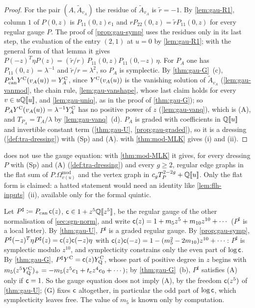 \begin{proof}
For the pair $(A,\tilde A_{v_A})$ the residue of $\tilde A_{v_A}$ is $\tilde r=-1$. By \cref{lem:gau-R1}, column $1$ of $P(0,z)$ is $P_{11}(0,z)e_1$ and $rP_{22}(0,z)=\tilde rP_{11}(0,z)$ for every regular gauge $P$. The proof of \cref{prop:gau-symp} uses the residues only in its last step, the evaluation of the entry $(2,1)$ at $u=0$ by \cref{lem:gau-R1}; with the general form of that lemma it gives $P(-z)^T\eta P(z)=(\tilde r/r)\,P_{11}(0,z)P_{11}(0,-z)\,\eta$. For $P_A$ one has $P_{11}(0,z)=\lambda^{-1}$ and $\tilde r/r=\lambda^2$, so $P_A$ is symplectic. By \cref{thm:gau-G}~(c), $P^A_{\mathrm{can}}Y^{\mathrm{C}}(v_A(u))=Y^{\mathrm C}_A$, since $Y^{\mathrm{C}}(v_A(u))$ is the vanishing solution of $\tilde A_{v_A}$ (\cref{lem:gau-vanmod}, the chain rule, \cref{lem:gau-vanshape}, whose last claim holds for every $v\in u\mathbb{Q}[\![ u ]\!]$, and \cref{lem:gau-uniq}, as in the proof of \cref{thm:gau-G}); so $P_AY^{\mathrm{C}}(v_A(u))=\lambda^{-1}Y^{\mathrm C}_A$ has no positive power of $z$ (\cref{lem:gau-vanq}), which is (A), and $T_{P_A}=T_A/\lambda$ by \cref{lem:gau-vanq}~(d). $P_A$ is graded with coefficients in $\mathbb{Q}[\![ u ]\!]$ and invertible constant term (\cref{thm:gau-U}, \cref{prop:gau-graded}), so it is a dressing (\cref{def:tra-dressing}) with (Sp) and (A).  with \cref{thm:mod-MLK} gives (i) and (ii).
\end{proof}

\begin{rmk}
\label{rmk:mai-annih}
 does not use the gauge equation: with \cref{thm:mod-MLK} it gives, for every dressing $P$ with (Sp) and (A) (\cref{def:tra-dressing}) and every $g\geq2$, regular edge graphs in the flat sum of $P.\Omega^{\mathrm{mod}}_{v(u)}$ and the vertex graph in $c_gT_P^{2-2g}+\mathbb{Q}[\![ u ]\!]$. Only the flat form is claimed: a hatted statement would need an identity like \cref{lem:flh-inputs}~(ii), available only for the formal quintic.
\end{rmk}

\begin{rmk}
\label{rmk:mai-stored}
Let $P^\sharp\coloneqq P_{\mathrm{can}}\,\mathsf{c}(z)$, $\mathsf{c}\in1+z^5\mathbb{Q}[\![ z^5 ]\!]$, be the regular gauge of the other normalisation of \cref{sec:sgn-norm}, and write $\mathsf{c}(z)=1+m_5z^5+m_{10}z^{10}+\cdots$ ($P^\sharp$ is a local letter). By \cref{thm:gau-U}, $P^\sharp$ is a graded regular gauge. By \cref{prop:gau-symp}, $P^\sharp(-z)^T\eta P^\sharp(z)=\mathsf{c}(z)\mathsf{c}(-z)\eta$ with $\mathsf{c}(z)\mathsf{c}(-z)=1-(m_5^2-2m_{10})z^{10}+\cdots$: $P^\sharp$ is symplectic modulo $z^{10}$, and symplecticity constrains only the even part of $\log\mathsf{c}$. By \cref{thm:gau-G}, $P^\sharp Y^{\mathrm{C}}=\mathsf{c}(z)Y^{\mathrm{C}}_{\mathrm{Q}}$, whose part of positive degree in $z$ begins with $m_5(z^5Y^{\mathrm{C}}_{\mathrm{Q}})_{+}=-m_5(z^5e_1+t_{\mathrm{c}} z^4e_0+\cdots)$; by \cref{thm:gau-G}~(b), $P^\sharp$ satisfies (A) only if $\mathsf{c}=1$. So the gauge equation does not imply (A), by the freedom $\mathsf{c}(z^5)$ of \cref{thm:gau-U}; (G) fixes $\mathsf{c}$ altogether, in particular the odd part of $\log\mathsf{c}$, which symplecticity leaves free. The value of $m_5$ is known only by computation.
\end{rmk}
